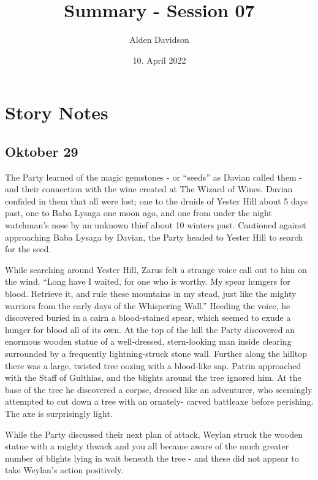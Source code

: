 \documentclass[a4paper,11pt]{article}
\title{Summary - Session 07}
\author{Alden Davidson}
\date{10. April 2022}
\begin{document}
\maketitle

\section{Story Notes}
\subsection{Oktober 29}
The Party learned of the magic gemstones - or ``seeds'' as Davian called them - and their connection with the wine
created at The Wizard of Wines. Davian confided in them that all were lost; one to the druids of Yester Hill about
5 days past, one to Baba Lysaga one moon ago, and one from under the night watchman's nose by an unknown thief about 
10 winters past. Cautioned against approaching Baba Lysaga by Davian, the Party headed to Yester Hill to search for 
the seed.

While searching around Yester Hill, Zarus felt a strange voice call out to him on the wind. ``Long have I waited, 
for one who is worthy. My spear hungers for blood. Retrieve it, and rule these mountains in my stead, just like the 
mighty warriors from the early days of the Whispering Wall.'' Heeding the voice, he discovered buried in a cairn a 
blood-stained spear, which seemed to exude a hunger for blood all of its own. At the top of the hill the Party 
discovered an enormous wooden statue of a well-dressed, stern-looking man inside clearing surrounded by a frequently 
lightning-struck stone wall. Further along the hilltop there was a large, twisted tree oozing with a blood-like sap. 
Patrin approached with the Staff of Gulthias, and the blights around the tree ignored him. At the base of the tree 
he discovered a corpse, dressed like an adventurer, who seemingly attempted to cut down a tree with an ornately-
carved battleaxe before perishing. The axe is surprisingly light.

While the Party discussed their next plan of attack, Weylan struck the wooden statue with a mighty thwack and you
all became aware of the much greater number of blights lying in wait beneath the tree - and these did not appear to 
take Weylan's action positively.
\end{document}

